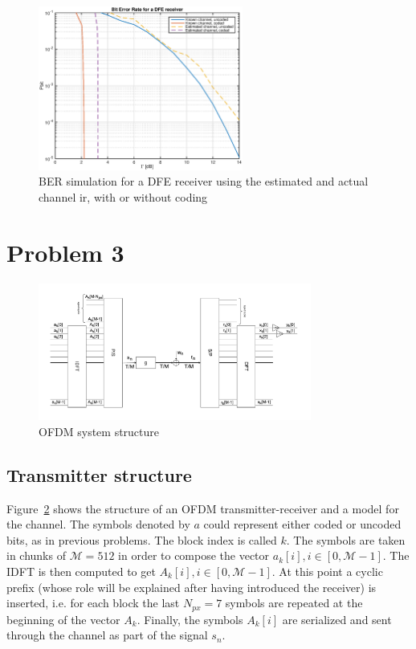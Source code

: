 \documentclass[10pt]{article}
\newcommand{\ofdM} {\mathcal{M}}
\begin{document}
\begin{figure}
	\centering
	\includegraphics[width = 0.6\textwidth]{problem2}
	\caption{BER simulation for a DFE receiver using the estimated and actual channel ir, with or without coding}
	\label{fig:problem2_pbit}
\end{figure}

\section*{Problem 3}

\begin{figure}
	\centering
	\includegraphics[width = 0.8\textwidth]{OFDM}
	\caption{OFDM system structure}
	\label{fig:OFDM}
\end{figure}

\subsection*{Transmitter structure}
Figure~\ref{fig:OFDM} shows the structure of an OFDM transmitter-receiver and a model for the channel. The symbols denoted by $a$ could represent either coded or uncoded bits, as in previous problems. The block index is called $k$. The symbols are taken in chunks of $\ofdM = 512$ in order to compose the vector $a_k[i], i \in [0, \ofdM - 1]$. The IDFT is then computed to get $A_k[i], i\in [0, \ofdM-1]$. At this point a cyclic prefix (whose role will be explained after having introduced the receiver) is inserted, i.e. for each block the last $N_{px} = 7$ symbols are repeated at the beginning of the vector $A_k$. Finally, the symbols $A_k[i]$ are serialized and sent through the channel as part of the signal $s_n$.
\end{document}
